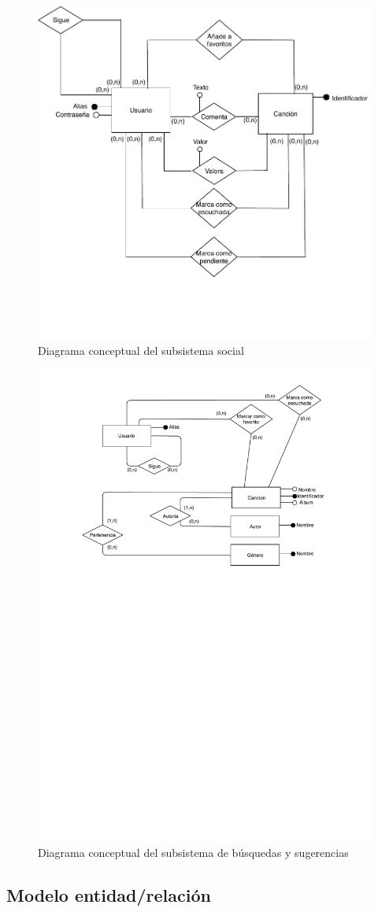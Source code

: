 \begin{figure}[H]
  \caption{Diagrama conceptual del subsistema social}
  \centering
  \includegraphics{diagramas/conceptual-social.pdf}
\end{figure}

\begin{figure}[H]
  \caption{Diagrama conceptual del subsistema de búsquedas y sugerencias}
  \centering
  \includegraphics{diagramas/busqueda_modelo_conceptual.pdf}
\end{figure}

\subsection{Modelo entidad/relación}
